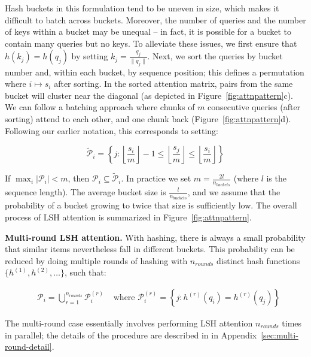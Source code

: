 Hash buckets in this formulation tend to be uneven in size, which makes it difficult to batch across buckets. Moreover, the number of queries and the number of keys within a bucket may be unequal -- in fact, it is possible for a bucket to contain many queries but no keys. To alleviate these issues, we first ensure that $h(k_j) = h(q_j)$ by setting $k_j = \frac{q_j}{\|q_j\|}$. Next, we sort the queries by bucket number and, within each bucket, by sequence position; this defines a permutation where $i \mapsto s_i$ after sorting. In the sorted attention matrix, pairs from the same bucket will cluster near the diagonal (as depicted in Figure~\ref{fig:attnpattern}c). We can follow a batching approach where chunks of $m$ consecutive queries (after sorting) attend to each other, and one chunk back (Figure~\ref{fig:attnpattern}d). Following our earlier notation, this corresponds to setting:

\begin{equation}
    \widetilde{\mathcal{P}}_i = \left\{ j : \left\lfloor \frac{s_i}{m}\right\rfloor - 1 \leq \left\lfloor \frac{s_j}{m}\right\rfloor \leq  \left\lfloor \frac{s_i}{m}\right\rfloor \right\}
\end{equation}

If $\max_i \left|\mathcal{P}_i\right| < m$, then $\mathcal{P}_i \subseteq \widetilde{\mathcal{P}}_i$. In practice we set $m = \frac{2l}{n_{buckets}}$ (where $l$ is the sequence length). The average bucket size is $\frac{l}{n_{buckets}}$, and we assume that the probability of a bucket growing to twice that size is sufficiently low. The overall process of LSH attention is summarized in Figure~\ref{fig:attnpattern}.

\textbf{Multi-round LSH attention.} With hashing, there is always a small probability that similar items nevertheless fall in different buckets. This probability can be reduced by doing multiple rounds of hashing with $n_{rounds}$ distinct hash functions $\{h^{(1)}, h^{(2)}, \ldots\}$, such that:

\begin{align}\label{eq:union-pairs}
    &\mathcal{P}_i = \bigcup_{r=1}^{n_{rounds}} \mathcal{P}^{(r)}_i
    & \text{ where } \mathcal{P}^{(r)}_i = \left\{ j : h^{(r)}(q_i) = h^{(r)}(q_j) \right\}
\end{align}

The multi-round case essentially involves performing LSH attention $n_{rounds}$ times in parallel; the details of the procedure are described in in Appendix~\ref{sec:multi-round-detail}.

